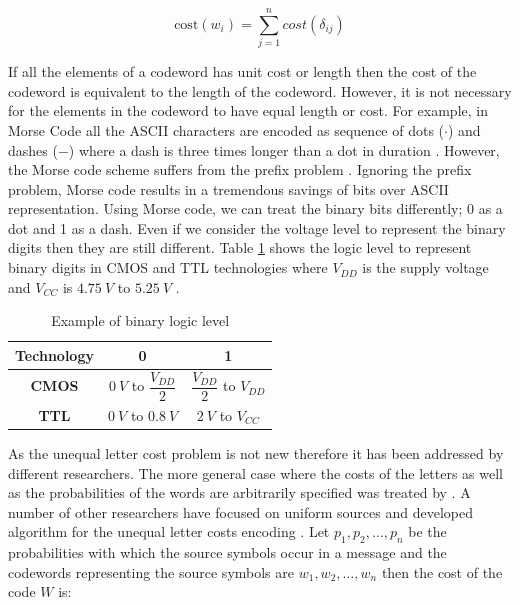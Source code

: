 \documentclass{singlecol-new}
\theoremstyle{TH}{
\newtheorem{lemma}{Lemma}
\newtheorem{theorem}[lemma]{Theorem}
\newtheorem{corrolary}[lemma]{Corrolary}
\newtheorem{conjecture}[lemma]{Conjecture}
\newtheorem{proposition}[lemma]{Proposition}
\newtheorem{claim}[lemma]{Claim}
\newtheorem{stheorem}[lemma]{Wrong Theorem}
}
\theoremstyle{THrm}{
\newtheorem{definition}{Definition}
\newtheorem{question}{Question}
\newtheorem{remark}{Remark}
\newtheorem{scheme}{Scheme}
}
\theoremstyle{THhit}{
\newtheorem{case}{Case}[section]
}
\begin{document}
\begin{equation}
\label{eqn1}
  \text{cost}\left(w_i\right)=\sum_{j=1}^{n}cost\left(\delta_{ij}\right)
\end{equation} 
  
If all the elements of a codeword has unit cost or length then the cost of the codeword is equivalent to the length of the codeword. However, it is not necessary for the elements in the codeword to have equal length or cost. For example, in Morse Code all the ASCII characters are encoded as sequence of dots ($\cdot$) and dashes ($-$) where a dash is three times longer than a dot in duration \citep{Redmond09}. However, the Morse code scheme suffers from the prefix problem \citep{Gr03}. Ignoring the prefix problem, Morse code results in a tremendous savings of bits over ASCII representation. Using Morse code, we can treat the binary bits differently; 0 as a dot and 1 as a dash. Even if we consider the voltage level to represent the binary digits then they are still different. Table \ref{table1} shows the logic level to represent binary digits in CMOS and TTL technologies where $V_{DD}$ is the supply voltage and $V_{CC}$ is $4.75~V$ to $5.25~V$ . 

\begin{table}[h]
\renewcommand{\arraystretch}{1.8}
\caption{Example of binary logic level}
\label{table1}
\begin{tabular}{ c  c  c }
\toprule
 \bfseries Technology  & 0 & 1\\
\hline
\bfseries CMOS & $0~V$ to $\dfrac{V_{DD}}{2}$&$\dfrac{V_{DD}}{2}$ to $V_{DD}$\\
\bfseries TTL & $0~V$ to $0.8~V$&$2~V$ to $V_{CC}$ \\
\bottomrule
\end{tabular}
\end{table}

As the unequal letter cost problem is not new therefore it has been addressed by different researchers. The more general case where the costs of the letters as well as the probabilities of the words are arbitrarily specified was treated by \citet{Karp61}. A number of other researchers have focused on uniform sources and developed algorithm for the unequal letter costs encoding \citep{Gil95, Kar62,Varn71,AltMel80,perl1975}.  Let $p_1,p_2,\ldots,p_n$ be the probabilities with which the source symbols occur in a message and the codewords representing the source symbols are $w_1,w_2,\ldots,w_n$ then the cost of the code $W$ is:
\end{document}
